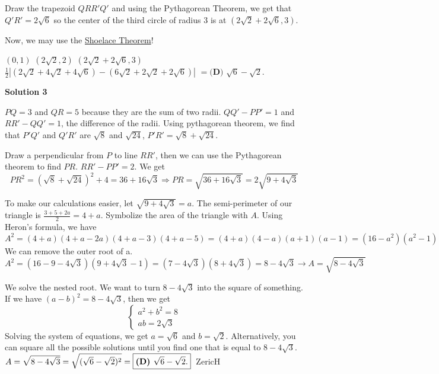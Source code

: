 \begin{enumerate}
 Draw the trapezoid $QRR'Q'$ and using the Pythagorean Theorem, we get that $Q'R' = 2\sqrt{6}$ so the center of the third circle of radius 3 is at $(2\sqrt{2}+2\sqrt{6}, 3)$.

 Now, we may use the \href{https://artofproblemsolving.com/wiki/index.php?title=Shoelace\_Theorem}{Shoelace Theorem}!

 $(0,1)$
$(2\sqrt{2}, 2)$
$(2\sqrt{2}+2\sqrt{6}, 3)$
$\frac{1}{2}|(2\sqrt{2}+4\sqrt{2}+4\sqrt{6})-(6\sqrt{2}+2\sqrt{2}+2\sqrt{6})|$
$=\boxed{\textbf{(D) }\sqrt{6}-\sqrt{2}.}$




\textbf{Solution 3}

$PQ = 3$ and $QR = 5$ because they are the sum of two radii. $QQ' - PP' = 1$ and $RR' - QQ' = 1$, the difference of the radii. Using pythagorean theorem, we find that $P'Q'$ and $Q'R'$ are $\sqrt{8}$ and $\sqrt{24}$, $P'R' = \sqrt{8} + \sqrt{24}$. 

 Draw a perpendicular from $P$ to line $RR'$, then we can use the Pythagorean theorem to find $PR$. $RR' - PP' = 2$. We get 
 \[PR^2 = (\sqrt{8} + \sqrt{24})^2 + 4 = 36 + 16\sqrt{3} \Rightarrow PR = \sqrt{36 + 16\sqrt{3}} = 2\sqrt{9 + 4\sqrt{3}}\]

 To make our calculations easier, let $\sqrt{9 + 4\sqrt{3}} = a$. The semi-perimeter of our triangle is $\frac{3 + 5 + 2a}{2} = 4 + a$. Symbolize the area of the triangle with $A$. Using Heron's formula, we have 
 \[A^2 = (4 + a)(4 + a - 2a)(4 + a - 3)(4 + a - 5) = (4 + a)(4 - a)(a + 1)(a - 1) = (16 - a^2)(a^2 - 1)\] We can remove the outer root of a. 
 \[A^2 = (16 - 9 - 4\sqrt{3})(9 + 4\sqrt{3} - 1) = (7 - 4\sqrt{3})(8 + 4\sqrt{3}) = 8 - 4\sqrt{3} \rightarrow A = \sqrt{8 - 4\sqrt{3}}\]

 We solve the nested root. We want to turn $8 - 4\sqrt{3}$ into the square of something. If we have $(a - b) ^ 2 = 8 - 4\sqrt{3}$, then we get 
 \[\begin{cases} a^2 + b^2 = 8 \\ ab = 2\sqrt{3} \end{cases}\] Solving the system of equations, we get $a = \sqrt{6}$ and $b = \sqrt{2}$. Alternatively, you can square all the possible solutions until you find one that is equal to $8 - 4\sqrt{3}.$ $\newline A = \sqrt{8 - 4\sqrt{3}} = \sqrt{(\sqrt{6} - \sqrt{2})^2} = \boxed{\textbf{(D) }\sqrt{6}-\sqrt{2}.}$~ZericH

 




\end{enumerate}
